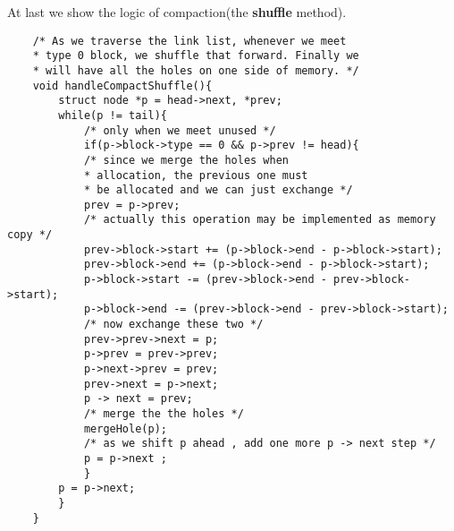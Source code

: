 \documentclass[12pt]{extarticle}
\newcommand{\<}{\langle}
\renewcommand{\>}{\rangle}
\theoremstyle{definition}
\begin{document}
	At last we show the logic of compaction(the \textbf{shuffle} method).
	\begin{lstlisting}
	/* As we traverse the link list, whenever we meet 
	* type 0 block, we shuffle that forward. Finally we 
	* will have all the holes on one side of memory. */
	void handleCompactShuffle(){
		struct node *p = head->next, *prev;
		while(p != tail){
			/* only when we meet unused */
			if(p->block->type == 0 && p->prev != head){
			/* since we merge the holes when 
			* allocation, the previous one must
			* be allocated and we can just exchange */
			prev = p->prev;
			/* actually this operation may be implemented as memory copy */
			prev->block->start += (p->block->end - p->block->start);
			prev->block->end += (p->block->end - p->block->start);
			p->block->start -= (prev->block->end - prev->block->start);
			p->block->end -= (prev->block->end - prev->block->start);
			/* now exchange these two */
			prev->prev->next = p;
			p->prev = prev->prev;
			p->next->prev = prev;
			prev->next = p->next;
			p -> next = prev;
			/* merge the the holes */
			mergeHole(p);
			/* as we shift p ahead , add one more p -> next step */
			p = p->next ;
			}
		p = p->next;
		}
	}
	\end{lstlisting}
\end{document}
